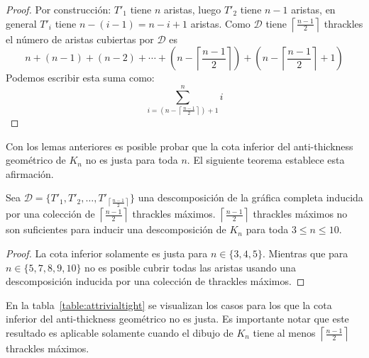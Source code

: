  \begin{proof}
   Por construcción: $T'_1$ tiene $n$ aristas, luego $T'_2$ tiene $n-1$ aristas, en general $T'_i$ tiene
   $n-(i-1) = n-i+1$ aristas. Como $\mathcal{D}$ tiene $\left\lceil\frac{n-1}{2}\right\rceil$ thrackles
   el número de aristas cubiertas por $\mathcal{D}$ es \[ n + (n-1) + (n-2) + \cdots + (n-\left\lceil\frac{n-1}{2}\right\rceil) +
   (n - \left\lceil\frac{n-1}{2}\right\rceil + 1)\]
   Podemos escribir esta suma como:
   \[\displaystyle \sum^n_{i=\left(n-\left\lceil\frac{n-1}{2}\right\rceil\right) + 1}i\]
 \end{proof}
%

Con los lemas anteriores es posible probar que la cota inferior del anti-thickness geométrico
de $K_n$ no es justa para toda $n$. El siguiente teorema establece esta afirmación.
\begin{theorem}
Sea $\mathcal{D}=\{T'_1,T'_2,\dots,T'_{\left\lceil\frac{n-1}{2}\right\rceil}\}$ una descomposición
de la gráfica completa inducida por una colección de $\left\lceil\frac{n-1}{2}\right\rceil$ thrackles máximos.
$\left\lceil\frac{n-1}{2}\right\rceil$ thrackles máximos no son
suficientes para inducir una descomposición de $K_n$ para toda $3 \leq n \leq 10$.
\end{theorem}
\begin{proof}
  La cota inferior solamente es justa para $n\in\{3,4,5\}$. Mientras que para $n\in \{5,7,8,9,10\}$
  no es posible cubrir todas las aristas usando una descomposición inducida por una colección
  de thrackles máximos.
\end{proof}
En la tabla~\ref{table:attrivialtight} se visualizan los casos para los que la cota
inferior del anti-thickness geométrico no es justa. Es importante
notar que este resultado es aplicable solamente cuando el dibujo de $K_n$ tiene al menos
$\left\lceil\frac{n-1}{2}\right\rceil$ thrackles máximos.

